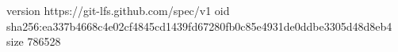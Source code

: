 version https://git-lfs.github.com/spec/v1
oid sha256:ea337b4668c4e02cf4845cd1439fd67280fb0c85e4931de0ddbe3305d48d8eb4
size 786528
